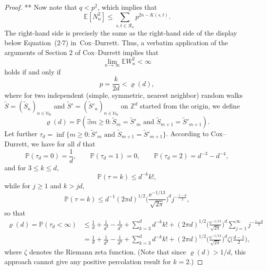 \documentclass{article}
\newcommand{\e}{\mathrm e}
\newcommand{\N}{\mathbb{N}}
\theoremstyle{definition}
\renewcommand{\P}{\mathbb{P}}
\newcommand{\1}{\mathbbm{1}}
\newcommand{\E}{\mathbb{E}}
\newcommand{\0}{\mathbf{o}}
\newcommand{\Z}{\mathbb{Z}}
\begin{document}
\begin{proof} \color{green} ** \color{black} Now note that $q<p^2$, which implies that
\[ \E[N_n^2] \leq \sum_{s,t\in \mathcal R_n} p^{2n-K(s,t)}. \]
The right-hand side is precisely the same as the right-hand side of the display below Equation~(2$\cdot$7) in~\color{red}Cox--Durrett\color{black}. Thus, a verbatim application of the arguments of \color{red} Section 2 of Cox--Durrett \color{black} implies that 
\[ \lim_{n\to\infty} \E W_n^2 <\infty \]
holds if and only if 
\[ p = \frac{k}{2d} < \varrho(d), \]
where for two independent (simple, symmetric, nearest neighbor) random walks $\widetilde S=(\widetilde S_n)_{n\in\N_0}$ and $\widetilde S'=(\widetilde S'_n)_{n\in\N_0}$ on $\Z^d$ started from the origin, we define
\[ \varrho(d) = \P(\exists m\geq 0 \colon \widetilde S_m = \widetilde S'_m \text{ and } \widetilde S_{m+1} = \widetilde S'_{m+1}). \]
Let further $\tau_d=\inf \{ m \geq 0 \colon \widetilde S'_m \text{ and } \widetilde S_{m+1} = \widetilde S'_{m+1} \}$.
According to \color{red} Cox--Durrett, \color{black} we have for all $d$ that
\begin{equation}\label{firstfew} \P(\tau_d=0)=\frac{1}{d}, \qquad \P(\tau_d=1)=0, \qquad \P(\tau_d=2)=d^{-3}-d^{-4}, \end{equation}
and for $3 \leq k \leq d$,
\[ \P(\tau=k) \leq d^{-k} k!, \]
while for $j\geq 1$ and $k >jd$,
\begin{equation}\label{bigk} \P(\tau=k) \leq d^{-1} (2\pi d)^{1/2} \Big( \frac{\e^{-1/13}}{\sqrt{2\pi}} \Big)^d j^{-\frac{1-d}{2}}, \end{equation}
so that
\begin{equation}\label{CDUB} \begin{aligned} \varrho(d)=\P(\tau_d<\infty) &\leq \frac{1}{d} + \frac{1}{d^3} -\frac{1}{d^4} + \sum_{k=3}^d d^{-k} k! +  (2\pi d)^{1/2} \Big( \frac{\e^{-1/13}}{\sqrt{2\pi}} \Big)^d \sum_{j=1}^{\infty} j^{-\frac{1-d}{2}} \\ & = \frac{1}{d} + \frac{1}{d^3} -\frac{1}{d^4} + \sum_{k=3}^d d^{-k} k! +  (2\pi d)^{1/2} \Big( \frac{\e^{-1/13}}{\sqrt{2\pi}} \Big)^d \zeta\Big( \frac{d-1}{2} \Big), \end{aligned} \end{equation}
where $\zeta$ denotes the Riemann zeta function. (Note that since $\varrho(d)>1/d$, this approach cannot give any positive percolation result for $k=2$.)



\end{proof}
\end{document}

